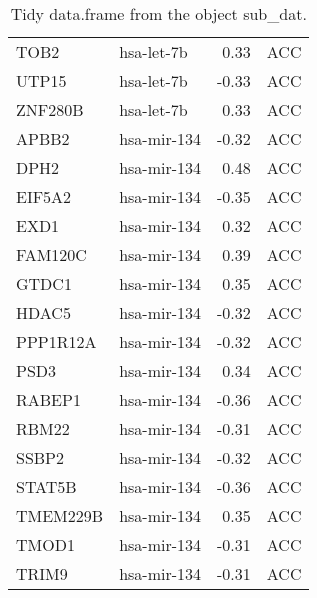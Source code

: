 \begin{table}[ht]
\begin{tabular}{llrl}
  TOB2 & hsa-let-7b & 0.33 & ACC \\ 
  UTP15 & hsa-let-7b & -0.33 & ACC \\ 
  ZNF280B & hsa-let-7b & 0.33 & ACC \\ 
  APBB2 & hsa-mir-134 & -0.32 & ACC \\ 
  DPH2 & hsa-mir-134 & 0.48 & ACC \\ 
  EIF5A2 & hsa-mir-134 & -0.35 & ACC \\ 
  EXD1 & hsa-mir-134 & 0.32 & ACC \\ 
  FAM120C & hsa-mir-134 & 0.39 & ACC \\ 
  GTDC1 & hsa-mir-134 & 0.35 & ACC \\ 
  HDAC5 & hsa-mir-134 & -0.32 & ACC \\ 
  PPP1R12A & hsa-mir-134 & -0.32 & ACC \\ 
  PSD3 & hsa-mir-134 & 0.34 & ACC \\ 
  RABEP1 & hsa-mir-134 & -0.36 & ACC \\ 
  RBM22 & hsa-mir-134 & -0.31 & ACC \\ 
  SSBP2 & hsa-mir-134 & -0.32 & ACC \\ 
  STAT5B & hsa-mir-134 & -0.36 & ACC \\ 
  TMEM229B & hsa-mir-134 & 0.35 & ACC \\ 
  TMOD1 & hsa-mir-134 & -0.31 & ACC \\ 
  TRIM9 & hsa-mir-134 & -0.31 & ACC \\ 
   \hline
\end{tabular}
\caption{Tidy data.frame from the object sub\_dat.} 
\label{table2}
\end{table}

